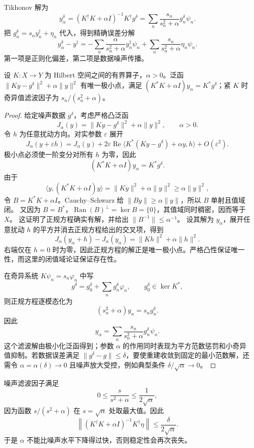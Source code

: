 Tikhonov 解为
\[
y_\alpha^\delta
=(K^\dagger K+\alpha I)^{-1}K^\dagger g^\delta
=\sum_n\frac{s_n}{s_n^2+\alpha}g_n^\delta\psi_n.
\]
把 $g_n^\delta=s_ny_n^\dagger+\eta_n$ 代入，得到精确误差分解
\begin{equation*}{
y_\alpha^\delta-y^\dagger
=-\sum_n\frac{\alpha}{s_n^2+\alpha}y_n^\dagger\psi_n
+\sum_n\frac{s_n}{s_n^2+\alpha}\eta_n\psi_n
}.\end{equation*}
第一项是正则化偏差，第二项是数据噪声传播。

\begin{proposition}
设 $K:X\to Y$ 为 Hilbert 空间之间的有界算子，$\alpha>0$。泛函 $\|Ky-g^\delta\|^2+\alpha\|y\|^2$ 有唯一极小点，满足 $(K^*K+\alpha I)y_\alpha=K^*g^\delta$；紧 $K$ 时奇异值滤波因子为 $s_n/(s_n^2+\alpha)$。
\end{proposition}
\begin{proof}
给定噪声数据 $g^\delta$，考虑严格凸泛函
\[
J_\alpha(y)
=\|Ky-g^\delta\|^2
+\alpha\|y\|^2,
\qquad \alpha>0.
\]
令 $h$ 为任意扰动方向。对实参数 $\varepsilon$ 展开
\[
J_\alpha(y+\varepsilon h)
=J_\alpha(y)
+2\varepsilon\operatorname{Re}
\langle K^*(Ky-g^\delta)+\alpha y,h\rangle
+O(\varepsilon^2).
\]
极小点必须使一阶变分对所有 $h$ 为零，因此
\[
(K^*K+\alpha I)y_\alpha=K^*g^\delta.
\]
由于
\[
\langle y,(K^*K+\alpha I)y\rangle
=\|Ky\|^2+\alpha\|y\|^2
\ge\alpha\|y\|^2,
\]
令 $B=K^*K+\alpha I$。Cauchy--Schwarz 给 $\|By\|\ge\alpha\|y\|$，所以 $B$ 单射且值域闭。
又因为 $B=B^*$，$\operatorname{Ran}(B)^\perp=\ker B=\{0\}$，其值域同时稠密，因而等于 $X$。
这证明了正规方程确实有解，并给出 $\|B^{-1}\|\le\alpha^{-1}$。
设其解为 $y_\alpha$，展开任意扰动 $h$ 的平方并消去正规方程给出的交叉项，得到
\[
J_\alpha(y_\alpha+h)-J_\alpha(y_\alpha)=\|Kh\|^2+\alpha\|h\|^2.
\]
右端仅在 $h=0$ 时为零，因此正规方程的解正是唯一极小点。严格凸性保证唯一性，而这里的闭值域论证保证存在性。

在奇异系统 $K\psi_n=s_n\varphi_n$ 中写
\[
g^\delta=g_0^\delta+\sum_n g_n^\delta\varphi_n,
\qquad g_0^\delta\in\ker K^*,
\]
则正规方程逐模态化为
\[
(s_n^2+\alpha)y_n=s_ng_n^\delta.
\]
因此
\[
y_\alpha
=\sum_n\frac{s_n}{s_n^2+\alpha}g_n^\delta\psi_n.
\]
这个滤波解由极小化泛函得到；参数 $\alpha$ 的作用同时表现为平方范数惩罚和小奇异值抑制。若数据误差满足 $\|g^\delta-g\|\le\delta$，要使重建收敛到固定的最小范数解，还需令 $\alpha=\alpha(\delta)\to0$ 且噪声放大受控，例如典型条件 $\delta/\sqrt{\alpha}\to0$。
\end{proof}


噪声滤波因子满足
\[
0\le \frac{s}{s^2+\alpha}\le\frac1{2\sqrt\alpha},
\]
因为函数 $s/(s^2+\alpha)$ 在 $s=\sqrt\alpha$ 处取最大值。因此
\[
\left\|
(K^\dagger K+\alpha I)^{-1}K^\dagger\eta
\right\|
\le\frac{\delta}{2\sqrt\alpha}.
\]
于是 $\alpha$ 不能比噪声水平下降得过快，否则稳定性会再次丧失。

